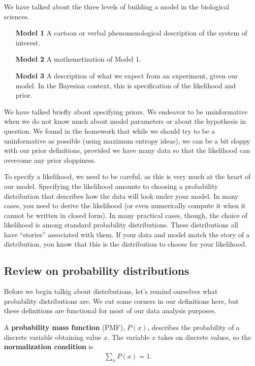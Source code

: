 We have talked about the three levels of building a model in the
biological sciences.
\begin{itemize}
\item[\textbf{Model 1}] A cartoon or verbal phenomenological
  description of the system of interest.
\item[\textbf{Model 2}] A mathemetization of Model 1.
\item[\textbf{Model 3}] A description of what we expect from an
  experiment, given our model.  In the Bayesian context, this is
  specification of the likelihood and prior.
\end{itemize}

We have talked briefly about specifying priors.  We endeavor to
be uninformative when we do not know much about model parameters or
about the hypothesis in question.  We found in the homework that while
we should try to be a uninformative as possible (using maximum entropy
ideas), we can be a bit sloppy with our prior definitions, provided we
have many data so that the likelihood can overcome any prior
sloppiness.

To specify a likelihood, we need to be careful, as this is very much
at the heart of our model.  Specifying the likelihood amounts to
choosing a probability distribution that describes how the data will
look under your model.  In many cases, you need to derive the
likelihood (or even numerically compute it when it cannot be written
in closed form).  In many practical cases, though, the choice of
likelihood is among standard probability distributions.  These
distributions all have ``stories'' associated with them.  If your data
and model match the story of a distribution, you know that this is the
distribution to choose for your likelihood.

\subsection{Review on probability distributions}
Before we begin talkig about distributions, let's remind ourselves
what probability distributions are.  We cut some corners in our
definitions here, but these definitions are functional for most of our
data analysis purposes.

A \textbf{probability mass function} (PMF), $P(x)$, describes the
probability of a discrete variable obtaining value $x$.  The variable
$x$ takes on discrete values, so the \textbf{normalization condition}
is
\begin{align}
\sum_x P(x) = 1.
\end{align}

